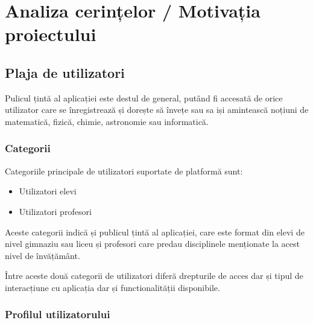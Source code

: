 \chapter{Analiza cerințelor / Motivația proiectului}
\label{chapter:analiza}

\section{Plaja de utilizatori}
\label{sec:proj}

Pulicul țintă al aplicației este destul de general, putând fi accesată de orice
utilizator care se înregistrează și dorește să învețe sau sa iși amintească noțiuni de matematică, fizică, chimie,
astronomie sau informatică.

\subsection{Categorii}
\label{sub-sec:proj-scope}

Categoriile principale de utilizatori suportate de platformă sunt:
\begin{itemize}
    \item Utilizatori elevi
    \item Utilizatori profesori
\end{itemize}

Aceste categorii indică și publicul țintă al aplicației, care este format din elevi de nivel gimnaziu sau liceu
și profesori care predau disciplinele menționate la acest nivel de învățământ.

Între aceste două categorii de utilizatori diferă drepturile de acces dar și tipul de interacțiune cu aplicația dar și
functionalității disponibile.

\subsection{Profilul utilizatorului}
\label{sub-sec:proj-user-profile}

